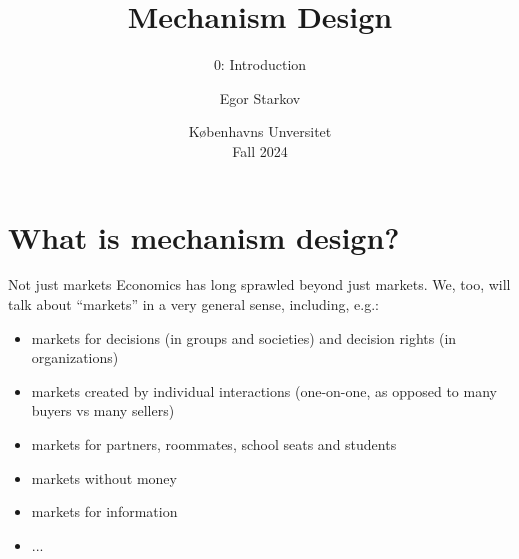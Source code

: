 \documentclass[english,10pt
,aspectratio=169
]{beamer}
\title{Mechanism Design}
\subtitle{0: Introduction}
\author{Egor Starkov}
\date{K{\o}benhavns Unversitet \\
	Fall 2024}
\begin{document}
	\frame[plain]{\titlepage}






\section{What is mechanism design?}




\begin{frame}{Not just markets}
	Economics has long sprawled beyond just markets. We, too, will talk about ``markets'' in a very general sense, including, e.g.:
	\pause 
	\begin{itemize}[<+->]
		\item markets for decisions (in groups and societies) and decision rights (in organizations)
		\item markets created by individual interactions (one-on-one, as opposed to many buyers vs many sellers)
		\item markets for partners, roommates, school seats and students
		\item markets without money
		\item markets for information
		\item ...
	\end{itemize}
\end{frame}
\end{document}
